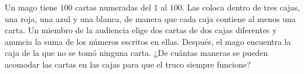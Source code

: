 Un mago tiene $100$ cartas numeradas del $1$ al $100$. Las coloca dentro de tres cajas, una roja, una azul y una blanca, de manera que cada caja contiene al menos una carta. Un miembro de la audiencia elige dos cartas de dos cajas diferentes y anuncia la suma de los números escritos en ellas. Después, el mago encuentra la caja de la que no se tomó ninguna carta. ¿De cuántas maneras se pueden acomodar las cartas en las cajas para que el truco siempre funcione?